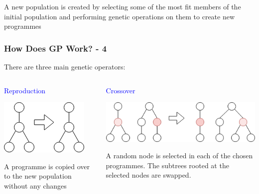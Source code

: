 \documentclass{beamer}
\newcommand{\blue}[1]{\textcolor{blue}{#1}}
\begin{document}
\begin{frame}
\begin{frame}
\begin{center}
				A new population is created by selecting some of the most fit members of the initial population and performing genetic operations on them to create new programmes
				
			\end{center}
		
		\end{frame}
	
		\begin{frame}
			
			\frametitle{How Does GP Work? - 4}
			
			There are three main genetic operators:
			
			\medskip
			\pause
			
			\begin{columns}[T]
				
				\begin{column}{0.2\textwidth}
					
					\blue{Reproduction}
					
					\medskip
					
					\includegraphics[scale=0.35]{resources/5_reproduction}
					
					\begin{small}
						A programme is copied over to the new population without any changes
					\end{small}
				
				\end{column}
			
				\pause
			
				\begin{column}{0.4\textwidth}
					
					\blue{Crossover}
					
					\medskip
					
					\includegraphics[scale=0.35]{resources/6_crossover}
					\begin{small}
						A random node is selected in each of the chosen programmes. The subtrees rooted at the selected nodes are swapped.
					\end{small}
			

\end{column}
\end{columns}
\end{frame}
\end{frame}
\end{document}
